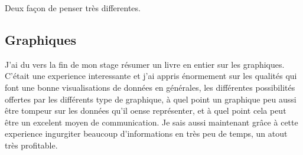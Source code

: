Deux façon de penser très differentes.

\subsection{Graphiques}
J'ai du vers la fin de mon stage résumer un livre en entier sur les graphiques. C'était une experience interessante et j'ai appris énormement sur les qualités qui font une bonne visualisations de données en générales, les différentes possibilités offertes par les différents type de graphique, à quel point un graphique peu aussi être tompeur sur les données qu'il oense représenter, et à quel point cela peut être un excelent moyen de communication. Je sais aussi maintenant grâce à cette experience ingurgiter beaucoup d'informations en très peu de temps, un atout très profitable.
